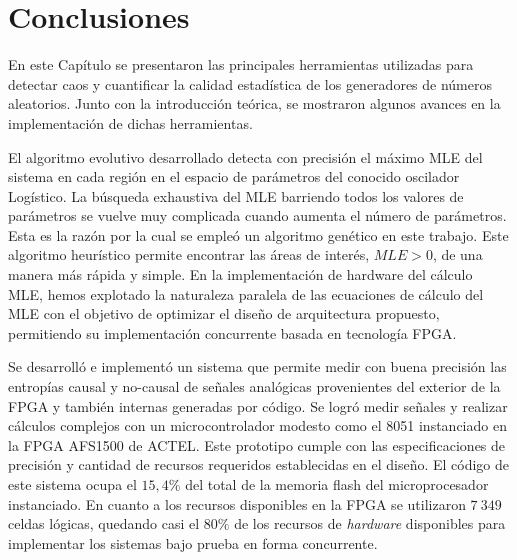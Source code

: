 \section{Conclusiones}

En este Capítulo se presentaron las principales herramientas utilizadas para detectar caos y cuantificar la calidad estadística de los generadores de números aleatorios.
Junto con la introducción teórica, se mostraron algunos avances en la implementación de dichas herramientas.

El algoritmo evolutivo desarrollado detecta con precisión el máximo MLE del sistema en cada región en el espacio de parámetros del conocido oscilador Logístico.
La búsqueda exhaustiva del MLE barriendo todos los valores de parámetros se vuelve muy complicada cuando aumenta el número de parámetros.
Esta es la razón por la cual se empleó un algoritmo genético en este trabajo.
Este algoritmo heurístico permite encontrar las áreas de interés, $ MLE> 0 $, de una manera más rápida y simple.
En la implementación de hardware del cálculo MLE, hemos explotado la naturaleza paralela de las ecuaciones de cálculo del MLE con el objetivo de optimizar el diseño de arquitectura propuesto, permitiendo su implementación concurrente basada en tecnología FPGA.

Se desarrolló e implementó un sistema que permite medir con buena precisión las entropías causal y no-causal de señales analógicas provenientes del exterior de la FPGA y también internas generadas por código.
Se logró medir señales y realizar cálculos complejos con un microcontrolador modesto como el 8051 instanciado en la FPGA AFS1500 de ACTEL.
Este prototipo cumple con las especificaciones de precisión y cantidad de recursos requeridos establecidas en el diseño.
El código de este sistema ocupa el $15,4\%$ del total de la memoria flash del microprocesador instanciado.
En cuanto a los recursos disponibles en la FPGA se utilizaron $7~349$ celdas lógicas, quedando casi el $80\%$ de los recursos de \textit{hardware} disponibles para implementar los sistemas bajo prueba en forma concurrente.

